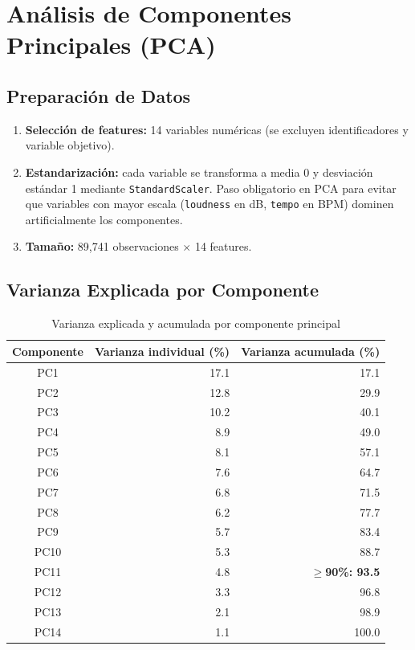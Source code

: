 \documentclass[12pt,a4paper]{article}
\begin{document}
\section{An\'alisis de Componentes Principales (PCA)}

\subsection{Preparaci\'on de Datos}

\begin{enumerate}[noitemsep]
  \item \textbf{Selecci\'on de features:} 14 variables num\'ericas (se excluyen
    identificadores y variable objetivo).
  \item \textbf{Estandarizaci\'on:} cada variable se transforma a media 0 y desviaci\'on
    est\'andar 1 mediante \texttt{StandardScaler}. Paso obligatorio en PCA para evitar que
    variables con mayor escala (\texttt{loudness} en dB, \texttt{tempo} en BPM) dominen
    artificialmente los componentes.
  \item \textbf{Tama\~no:} 89{,}741 observaciones $\times$ 14 features.
\end{enumerate}

\subsection{Varianza Explicada por Componente}

\begin{table}[H]
\centering
\caption{Varianza explicada y acumulada por componente principal}
\begin{tabular}{crr}
\toprule
\textbf{Componente} & \textbf{Varianza individual (\%)} &
  \textbf{Varianza acumulada (\%)} \\
\midrule
PC1  & 17.1 &  17.1 \\
PC2  & 12.8 &  29.9 \\
PC3  & 10.2 &  40.1 \\
PC4  &  8.9 &  49.0 \\
PC5  &  8.1 &  57.1 \\
PC6  &  7.6 &  64.7 \\
PC7  &  6.8 &  71.5 \\
PC8  &  6.2 &  77.7 \\
PC9  &  5.7 &  83.4 \\
PC10 &  5.3 &  88.7 \\
PC11 &  4.8 &  \textbf{$\geq$90\%: 93.5} \\
PC12 &  3.3 &  96.8 \\
PC13 &  2.1 &  98.9 \\
PC14 &  1.1 & 100.0 \\
\bottomrule
\end{tabular}
\end{table}
\end{document}
